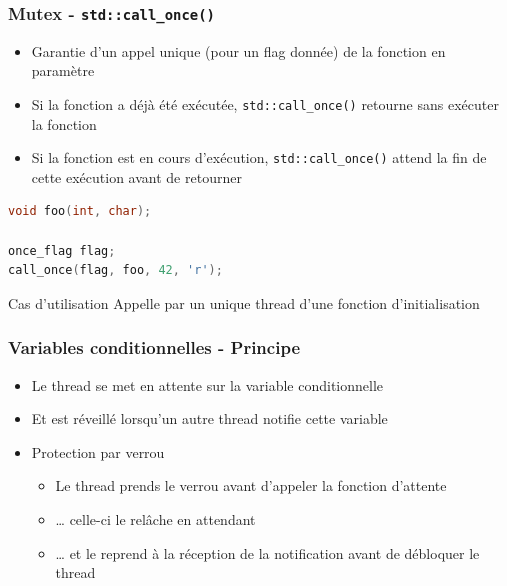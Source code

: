 \documentclass[C++.tex]{subfiles}
\begin{document}
\begin{frame}[fragile]
	\frametitle{Mutex - \lstinline|std::call_once()|}
	\begin{itemize}
		\item Garantie d'un appel unique (pour un flag donnée) de la fonction en paramètre
		\item Si la fonction a déjà été exécutée, \lstinline|std::call_once()| retourne sans exécuter la fonction
		\item Si la fonction est en cours d'exécution, \lstinline|std::call_once()| attend la fin de cette exécution avant de retourner
	\end{itemize}

	\begin{lstlisting}[language=C++]
void foo(int, char);

once_flag flag;
call_once(flag, foo, 42, 'r');\end{lstlisting}

	\begin{block}{Cas d'utilisation}
		Appelle par un unique thread d'une fonction d'initialisation
	\end{block}
\end{frame}

\begin{frame}[fragile]
	\frametitle{Variables conditionnelles - Principe}
	\begin{itemize}
		\item Le thread se met en attente sur la variable conditionnelle
		\item Et est réveillé lorsqu'un autre thread notifie cette variable
		\item Protection par verrou
		\begin{itemize}
			\item Le thread prends le verrou avant d'appeler la fonction d'attente
			\item \ldots{} celle-ci le relâche en attendant
			\item \ldots{} et le reprend à la réception de la notification avant de débloquer le thread
		\end{itemize}
	\end{itemize}
\end{frame}
\end{document}
